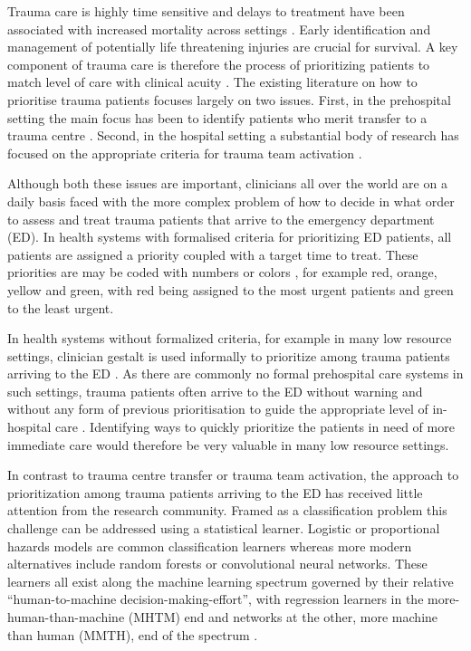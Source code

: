 \documentclass[10pt,letterpaper]{article}\usepackage[]{graphicx}\usepackage[]{color}
\begin{document}
Trauma care is highly time sensitive and delays to treatment have been
associated with increased mortality across settings
\cite{Yeboah2014,OReilly2013,Roy2017a}. Early identification and management of
potentially life threatening injuries are crucial for survival. A key component
of trauma care is therefore the process of prioritizing patients to match level
of care with clinical acuity \cite{EAST2010,NICE2016}. The existing literature
on how to prioritise trauma patients focuses largely on two issues. First, in
the prehospital setting the main focus has been to identify patients who merit
transfer to a trauma centre \cite{Voskens2018}. Second, in the hospital setting
a substantial body of research has focused on the appropriate criteria for
trauma team activation \cite{VanRein2018,Tignanelli2018}.

Although both these issues are important, clinicians all over the world are on a
daily basis faced with the more complex problem of how to decide in what order
to assess and treat trauma patients that arrive to the emergency department
(ED). In health systems with formalised criteria for prioritizing ED patients,
all patients are assigned a priority coupled with a target time to treat. These
priorities are may be coded with numbers \cite{ESI2012} or colors
\cite{SATG2012}, for example red, orange, yellow and green, with red being
assigned to the most urgent patients and green to the least urgent.

In health systems without formalized criteria, for example in many low resource
settings, clinician gestalt is used informally to prioritize among trauma
patients arriving to the ED \cite{Baker2013}. As there are commonly no formal
prehospital care systems in such settings, trauma patients often arrive to the
ED without warning and without any form of previous prioritisation to guide the
appropriate level of in-hospital care \cite{Choi2017}. Identifying ways to
quickly prioritize the patients in need of more immediate care would therefore
be very valuable in many low resource settings.

In contrast to trauma centre transfer or trauma team activation, the approach to
prioritization among trauma patients arriving to the ED has received little
attention from the research community. Framed as a classification problem this
challenge can be addressed using a statistical learner. Logistic or proportional
hazards models are common classification learners whereas more modern
alternatives include random forests or convolutional neural networks. These
learners all exist along the machine learning spectrum governed by their
relative ``human-to-machine decision-making-effort'', with regression learners
in the more-human-than-machine (MHTM) end and networks at the other, more
machine than human (MMTH), end of the spectrum \cite{Beam2018}.
\end{document}
